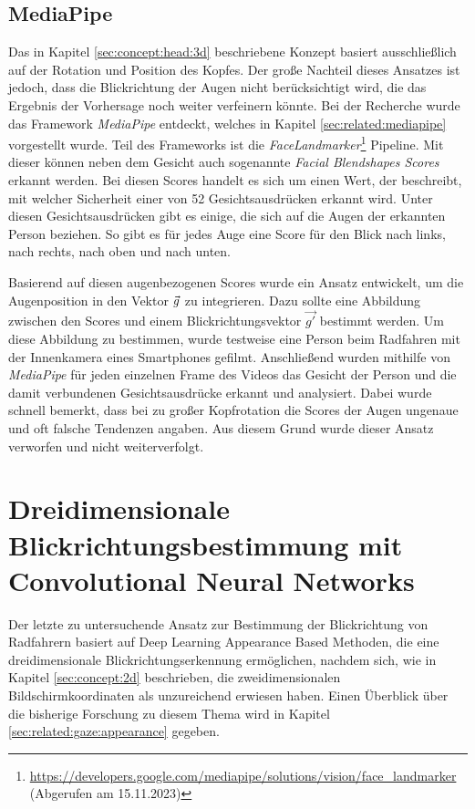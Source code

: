 \subsection{MediaPipe}

Das in Kapitel \ref{sec:concept:head:3d} beschriebene Konzept basiert ausschließlich auf der Rotation und Position des Kopfes. Der große Nachteil dieses Ansatzes ist jedoch, dass die Blickrichtung der Augen nicht berücksichtigt wird, die das Ergebnis der Vorhersage noch weiter verfeinern könnte. Bei der Recherche wurde das Framework \textit{MediaPipe} \cite{paper:mediapipe} entdeckt, welches in Kapitel \ref{sec:related:mediapipe} vorgestellt wurde. Teil des Frameworks ist die \textit{FaceLandmarker}\footnote{\url{https://developers.google.com/mediapipe/solutions/vision/face_landmarker} (Abgerufen am 15.11.2023)} Pipeline. Mit dieser können neben dem Gesicht auch sogenannte \textit{Facial Blendshapes Scores} erkannt werden. Bei diesen Scores handelt es sich um einen Wert, der beschreibt, mit welcher Sicherheit einer von 52 Gesichtsausdrücken erkannt wird. Unter diesen Gesichtsausdrücken gibt es einige, die sich auf die Augen der erkannten Person beziehen. So gibt es für jedes Auge eine Score für den Blick nach links, nach rechts, nach oben und nach unten.

Basierend auf diesen augenbezogenen Scores wurde ein Ansatz entwickelt, um die Augenposition in den Vektor $\vec{g}$ zu integrieren. Dazu sollte eine Abbildung zwischen den Scores und einem Blickrichtungsvektor $\vec{g'}$ bestimmt werden. Um diese Abbildung zu bestimmen, wurde testweise eine Person beim Radfahren mit der Innenkamera eines Smartphones gefilmt. Anschließend wurden mithilfe von \textit{MediaPipe} für jeden einzelnen Frame des Videos das Gesicht der Person und die damit verbundenen Gesichtsausdrücke erkannt und analysiert. Dabei wurde schnell bemerkt, dass bei zu großer Kopfrotation die Scores der Augen ungenaue und oft falsche Tendenzen angaben. Aus diesem Grund wurde dieser Ansatz verworfen und nicht weiterverfolgt.

\section{Dreidimensionale Blickrichtungsbestimmung mit Convolutional Neural Networks}\label{sec:concept:3d}

Der letzte zu untersuchende Ansatz zur Bestimmung der Blickrichtung von Radfahrern basiert auf Deep Learning Appearance Based Methoden, die eine dreidimensionale Blickrichtungserkennung ermöglichen, nachdem sich, wie in Kapitel \ref{sec:concept:2d} beschrieben, die zweidimensionalen Bildschirmkoordinaten als unzureichend erwiesen haben. Einen Überblick über die bisherige Forschung zu diesem Thema wird in Kapitel \ref{sec:related:gaze:appearance} gegeben. 

